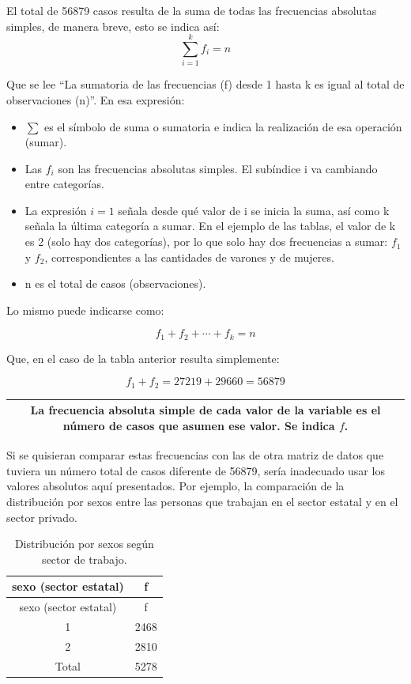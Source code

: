 \documentclass[]{book}
\begin{document}
El total de 56879 casos resulta de la suma de todas las frecuencias absolutas simples, de manera breve, esto se indica así: \[\sum_{i=1}^{k}f_i =n\]

Que se lee ``La sumatoria de las frecuencias (f) desde 1 hasta k es igual al total de observaciones (n)''.
En esa expresión:

\begin{itemize}
\item
  \(\sum\) es el símbolo de suma o sumatoria e indica la realización de esa operación (sumar).
\item
  Las \(f_i\) son las frecuencias absolutas simples. El subíndice i va cambiando entre categorías.
\item
  La expresión \(i=1\) señala desde qué valor de i se inicia la suma, así como k señala la última categoría a sumar. En el ejemplo de las tablas, el valor de k es 2 (solo hay dos categorías), por lo que solo hay dos frecuencias a sumar: \(f_1\) y \(f_2\), correspondientes a las cantidades de varones y de mujeres.
\item
  n es el total de casos (observaciones).
\end{itemize}

Lo mismo puede indicarse como:

\[f_1 + f_2 + ⋯ + f_k = n\]

Que, en el caso de la tabla anterior resulta simplemente:

\[f_1 + f_2 = 27219 + 29660 = 56879\]

\begin{longtable}[]{@{}c@{}}
\toprule
\endhead
\begin{minipage}[t]{0.97\columnwidth}\centering
La \textbf{frecuencia absoluta simple} de cada valor de la variable es el número de casos que asumen ese valor. Se indica \(f\).\strut
\end{minipage}\tabularnewline
\bottomrule
\end{longtable}

Si se quisieran comparar estas frecuencias con las de otra matriz de datos que tuviera un número total de casos diferente de 56879, sería inadecuado usar los valores absolutos aquí presentados. Por ejemplo, la comparación de la distribución por sexos entre las personas que trabajan en el sector estatal y en el sector privado.

\begin{longtable}[]{@{}cc@{}}
\caption{\label{tab:unnamed-chunk-42}Distribución por sexos según sector de trabajo.}\tabularnewline
\toprule
sexo (sector estatal) & f\tabularnewline
\midrule
\endfirsthead
\toprule
sexo (sector estatal) & f\tabularnewline
\midrule
\endhead
1 & 2468\tabularnewline
2 & 2810\tabularnewline
Total & 5278\tabularnewline
\bottomrule
\end{longtable}
\end{document}
